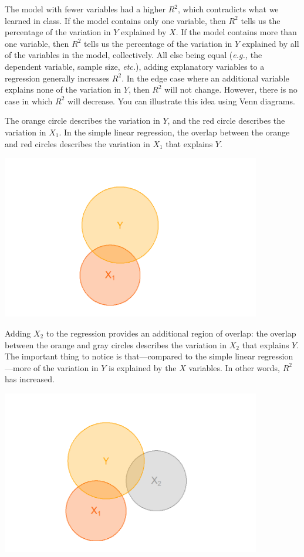 \documentclass[11pt]{article}
\begin{document}
\begin{onehalfspacing}
\begin{enumerate}
{\color{pine_green}
	The model with fewer variables had a higher $R^2$, which contradicts what we learned in class. If the model contains only one variable, then $R^2$ tells us the percentage of the variation in $Y$ explained by $X$. If the model contains more than one variable, then $R^2$ tells us the percentage of the variation in $Y$ explained by all of the variables in the model, collectively. All else being equal (\textit{e.g.,} the dependent variable, sample size, \textit{etc.}), adding explanatory variables to a regression generally increases $R^2$. In the edge case where an additional variable explains none of the variation in $Y$, then $R^2$ will not change. However, there is no case in which $R^2$ will decrease. You can illustrate this idea using Venn diagrams.
	
	The orange circle describes the variation in $Y$, and the red circle describes the variation in $X_1$. In the simple linear regression, the overlap between the orange and red circles describes the variation in $X_1$ that explains $Y$.
	
	\includegraphics[width=0.85\textwidth]{R2_base.png}
	
	Adding $X_2$ to the regression provides an additional region of overlap: the overlap between the orange and gray circles describes the variation in $X_2$ that explains $Y$. The important thing to notice is that---compared to the simple linear regression---more of the variation in $Y$ is explained by the $X$ variables. In other words, $R^2$ has increased.
	
	\includegraphics[width=0.85\textwidth]{R2_case1.png}
	
}
\end{enumerate}
\end{onehalfspacing}
\end{document}

